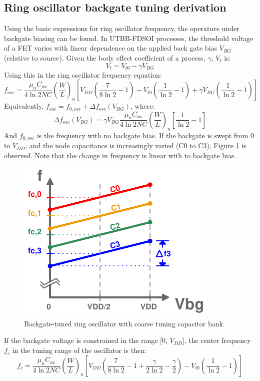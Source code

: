 \documentclass[10pt,a4paper]{article}
\begin{document}
	\subsection{Ring oscillator backgate tuning derivation}
	Using the basic expressions for ring oscillator frequency, the operature under backgate biasing can be found. In UTBB-FDSOI processes, the threshold voltage of a FET varies with linear dependence on the applied back gate bias $V_{BG}$ (relative to source). Given the body effect coefficient of a process, $\gamma$, $V_t$ is:
	\begin{equation}
		V_t = V_{t0} - \gamma V_{BG}
	\end{equation}
	Using this in the ring oscillator frequency equation:
	\begin{equation}
		f_{osc} = \frac{\mu_nC_{ox}}{4\ln2NC}\left(\frac{W}{L}\right)_n\left[V_{DD}\left(\frac{7}{8\ln2}-1\right)-V_{t0}\left(\frac{1}{\ln2}-1\right) + \gamma V_{BG}\left(\frac{1}{\ln2}-1\right) \right]
	\end{equation}
	Equivalently, $f_{osc} = f_{0,osc} + \Delta f_{osc}(V_{BG})$, where:
	\begin{equation}
		\Delta f_{osc}(V_{BG}) = \gamma V_{BG}\frac{\mu_nC_{ox}}{4\ln2NC}\left(\frac{W}{L}\right)_n\left[\frac{1}{\ln2}-1\right]
	\end{equation}	
	And $f_{0,osc}$ is the frequency with no backgate bias. If the backgate is swept from 0 to $V_{DD}$, and the node capacitance is increasingly varied (C0 to C3), Figure \ref{fig:rosc_tuning} is observed. Note that the change in frequency is linear with to backgate bias.
	\FloatBarrier
	\begin{figure}[htb!]
		\center\includegraphics[width=0.3\linewidth, angle=0]{figs/backgate_rosc_tuning2.pdf}
		\caption{Backgate-tuned ring oscillator with coarse tuning capacitor bank.}
		\label{fig:rosc_tuning}
	\end{figure}
	If the backgate voltage is constrained in the range [0, $V_{DD}$], the center frequency $f_c$ in the tuning range of the oscillator is then:
	\begin{equation}
		f_{c} = \frac{\mu_nC_{ox}}{4\ln2NC}\left(\frac{W}{L}\right)_n\left[V_{DD}\left(\frac{7}{8\ln2}-1+\frac{\gamma}{2\ln2}-\frac{\gamma}{2}\right)-V_{t0}\left(\frac{1}{\ln2}-1\right)\right]
	\end{equation}
\end{document}
